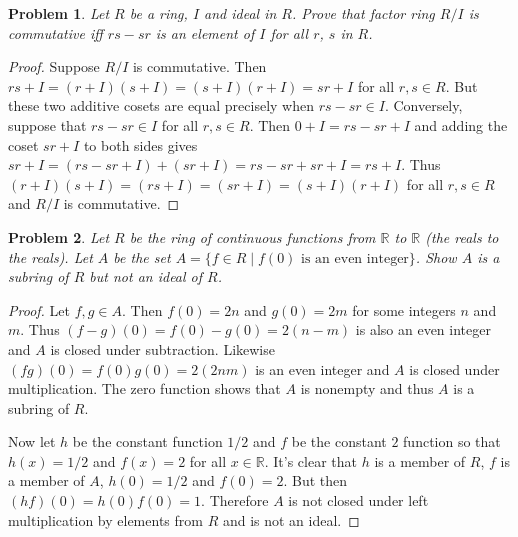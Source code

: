 \documentclass{article}
\newtheorem{problem}{Problem}
\begin{document}

\begin{problem}
Let $R$ be a ring, $I$ and ideal in $R$. Prove that factor ring $R/I$ is commutative iff $rs-sr$ is an element of $I$ for all $r$, $s$ in $R$.
\end{problem}
\begin{proof}
Suppose $R/I$ is commutative. Then $rs + I = (r + I)(s + I) = (s + I)(r + I) = sr + I$ for all $r,s \in R$. But these two additive cosets are equal precisely when $rs - sr \in I$. Conversely, suppose that $rs - sr \in I$ for all $r,s \in R$. Then $0 + I = rs - sr + I$ and adding the coset $sr + I$ to both sides gives $sr + I = (rs - sr + I) + (sr + I) = rs - sr + sr + I = rs + I$. Thus $(r + I)(s + I) = (rs + I) = (sr + I) = (s + I)(r + I)$ for all $r,s \in R$ and $R/I$ is commutative.
\end{proof}

\begin{problem}
Let $R$ be the ring of continuous functions from $\mathbb{R}$ to $\mathbb{R}$ (the reals to the reals). Let $A$ be the set $A = \{f \in R \mid \text{$f(0)$ is an even integer}\}$. Show $A$ is a subring of $R$ but not an ideal of $R$.
\end{problem}
\begin{proof}
Let $f, g \in A$. Then $f(0) = 2n$ and $g(0) = 2m$ for some integers $n$ and $m$. Thus $(f - g)(0) = f(0) - g(0) = 2(n - m)$ is also an even integer and $A$ is closed under subtraction. Likewise $(fg)(0) = f(0)g(0) = 2(2nm)$ is an even integer and $A$ is closed under multiplication. The zero function shows that $A$ is nonempty and thus $A$ is a subring of $R$.

Now let $h$ be the constant function $1/2$ and $f$ be the constant $2$ function so that $h(x) = 1/2$ and $f(x) = 2$ for all $x \in \mathbb{R}$. It's clear that $h$ is a member of $R$, $f$ is a member of $A$, $h(0) = 1/2$ and $f(0) = 2$. But then $(hf)(0) = h(0)f(0) = 1$. Therefore $A$ is not closed under left multiplication by elements from $R$ and is not an ideal.
\end{proof}
\end{document}
